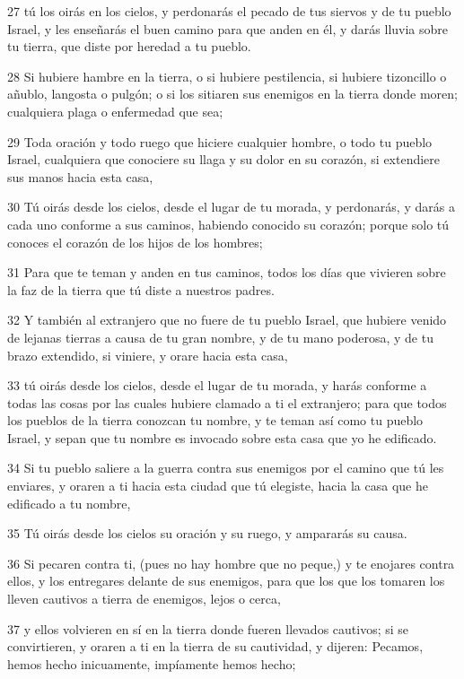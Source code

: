 \par 27 tú los oirás en los cielos, y perdonarás el pecado de tus siervos y de tu pueblo Israel, y les enseñarás el buen camino para que anden en él, y darás lluvia sobre tu tierra, que diste por heredad a tu pueblo.
\par 28 Si hubiere hambre en la tierra, o si hubiere pestilencia, si hubiere tizoncillo o añublo, langosta o pulgón; o si los sitiaren sus enemigos en la tierra donde moren; cualquiera plaga o enfermedad que sea;
\par 29 Toda oración y todo ruego que hiciere cualquier hombre, o todo tu pueblo Israel, cualquiera que conociere su llaga y su dolor en su corazón, si extendiere sus manos hacia esta casa,
\par 30 Tú oirás desde los cielos, desde el lugar de tu morada, y perdonarás, y darás a cada uno conforme a sus caminos, habiendo conocido su corazón; porque solo tú conoces el corazón de los hijos de los hombres;
\par 31 Para que te teman y anden en tus caminos, todos los días que vivieren sobre la faz de la tierra que tú diste a nuestros padres.
\par 32 Y también al extranjero que no fuere de tu pueblo Israel, que hubiere venido de lejanas tierras a causa de tu gran nombre, y de tu mano poderosa, y de tu brazo extendido, si viniere, y orare hacia esta casa,
\par 33  tú oirás desde los cielos, desde el lugar de tu morada, y harás conforme a todas las cosas por las cuales hubiere clamado a ti el extranjero; para que todos los pueblos de la tierra conozcan tu nombre, y te teman así como tu pueblo Israel, y sepan que tu nombre es invocado sobre esta casa que yo he edificado. 
\par 34 Si tu pueblo saliere a la guerra contra sus enemigos por el camino que tú les enviares, y oraren a ti hacia esta ciudad que tú elegiste, hacia la casa que he edificado a tu nombre,
\par 35 Tú oirás desde los cielos su oración y su ruego, y ampararás su causa.
\par 36 Si pecaren contra ti, (pues no hay hombre que no peque,) y te enojares contra ellos, y los entregares delante de sus enemigos, para que los que los tomaren los lleven cautivos a tierra de enemigos, lejos o cerca,
\par 37 y ellos volvieren en sí en la tierra donde fueren llevados cautivos; si se convirtieren, y oraren a ti en la tierra de su cautividad, y dijeren: Pecamos, hemos hecho inicuamente, impíamente hemos hecho;
